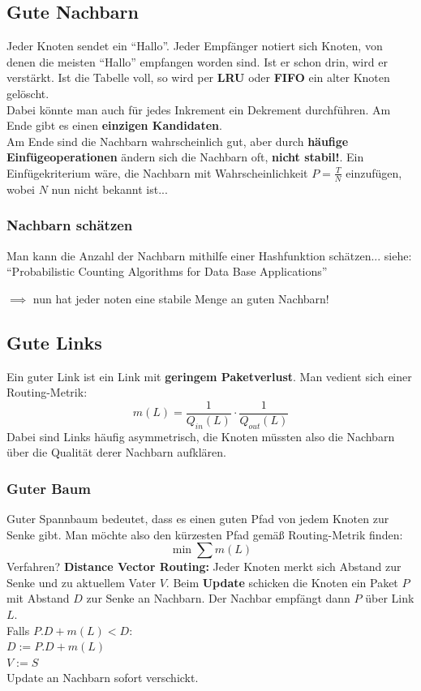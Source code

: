 \documentclass[a4paper]{article}
\begin{document}
\subsection{Gute Nachbarn}
Jeder Knoten sendet ein ``Hallo''. Jeder Empfänger notiert sich Knoten, von denen die meisten ``Hallo'' empfangen worden sind. Ist er schon drin, wird er verstärkt. Ist die Tabelle voll, so wird per \textbf{LRU} oder \textbf{FIFO} ein alter Knoten gelöscht.\\

Dabei könnte man auch für jedes Inkrement ein Dekrement durchführen. Am Ende gibt es einen \textbf{einzigen Kandidaten}.\\

Am Ende sind die Nachbarn wahrscheinlich gut, aber durch \textbf{häufige Einfügeoperationen } ändern sich die Nachbarn oft, \textbf{nicht stabil!}.
Ein Einfügekriterium wäre, die Nachbarn mit Wahrscheinlichkeit $P=\frac{T}{N}$ einzufügen, wobei $N$ nun nicht bekannt ist...
\subsubsection{Nachbarn schätzen}
Man kann die Anzahl der Nachbarn mithilfe einer Hashfunktion schätzen... siehe:\\
``Probabilistic Counting Algorithms for Data Base Applications''

$\implies$ nun hat jeder noten eine stabile Menge an guten Nachbarn!

\subsection{Gute Links}
Ein guter Link ist ein Link mit \textbf{geringem Paketverlust}. Man vedient sich einer Routing-Metrik:
$$m(L)= \frac{1}{Q_{in}(L)} \cdot \frac{1}{Q_{out}(L)}$$
Dabei sind Links häufig asymmetrisch, die Knoten müssten also die Nachbarn über die Qualität derer Nachbarn aufklären.\\

\subsubsection{Guter Baum}
Guter Spannbaum bedeutet, dass es einen guten Pfad von jedem Knoten zur Senke gibt. Man möchte also den kürzesten Pfad gemäß Routing-Metrik finden:
$$\min \sum m(L)$$
Verfahren? \textbf{Distance Vector Routing:} Jeder Knoten merkt sich Abstand zur Senke und zu aktuellem Vater $V$. Beim \textbf{Update} schicken die Knoten ein Paket $P$ mit Abstand $D$ zur Senke an Nachbarn. Der Nachbar empfängt dann $P$ über Link $L$.\\
Falls $P.D + m(L) < D$:\\
$D := P.D+m(L)$\\
$V := S$\\
Update an Nachbarn sofort verschickt.\\
\end{document}
